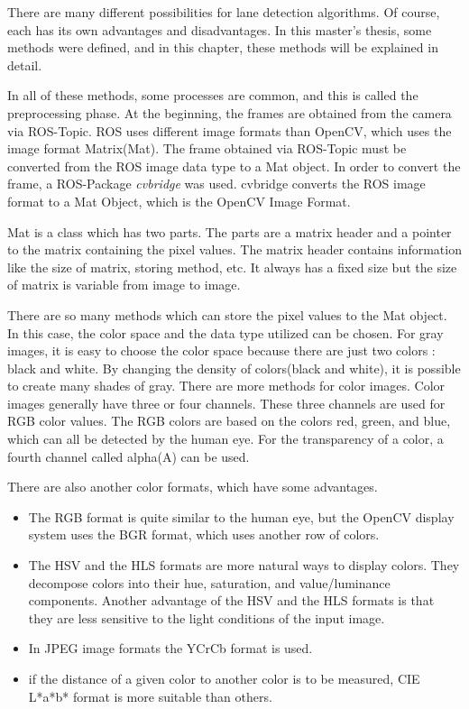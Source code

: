 There are many different possibilities for lane detection algorithms. Of course, each has its own advantages and disadvantages. In this master's thesis, some methods were defined, and in this chapter, these methods will be explained in detail.

In all of these methods, some processes are common, and this is called the preprocessing phase. At the beginning, the frames are obtained from the camera via ROS-Topic. ROS uses different image formats than OpenCV, which uses the image format Matrix(Mat). The frame obtained via ROS-Topic must be converted from the ROS image data type to a Mat object. In order to convert the frame, a ROS-Package \textit{cvbridge}\cite{cv_bridge} was used. cvbridge converts the ROS image format to a Mat Object, which is the OpenCV Image Format. 

Mat is a class which has two parts. The parts are a matrix header and a pointer to the matrix containing the pixel values. The matrix header contains information like the size of matrix, storing method, etc. It always has a fixed size but the size of matrix is variable from image to image.

There are so many methods which can store the pixel values to the Mat object. In this case, the color space and the data type utilized can be chosen. For gray images, it is easy to choose the color space because there are just two colors : black and white. By changing the density of colors(black and white), it is possible to create many shades of gray. There are more methods for color images. Color images generally have three or four channels. These three channels are used for RGB color values. The RGB colors are based on the colors red, green, and blue, which can all be detected by the human eye. For the transparency of a color, a fourth channel called alpha(A) can be used.

There are also another color formats, which have some advantages\cite{OpenCV_Mat}. 

\begin{itemize}

\item The RGB format is quite similar to the human eye, but the OpenCV display system uses the BGR format, which uses another row of colors.  

\item The HSV and the HLS formats are more natural ways to display colors. They decompose colors into their hue, saturation, and value/luminance components. Another advantage of the HSV and the HLS formats is that they are less sensitive to the light conditions of the input image.

\item In JPEG image formats the YCrCb format is used.

\item if the distance of a given color to another color is to be measured, CIE L*a*b* format is more suitable than others.

\end{itemize}




